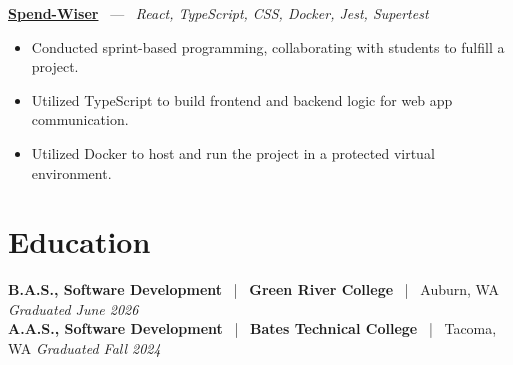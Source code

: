 \documentclass[10pt, letterpaper]{article}
\newcommand{\jobhead}[4]{%
  \vspace{5pt}%
  {\bfseries\color{dark}#1}%
  ~{\color{light}|}~%
  {\bfseries\color{navy}#2}%
  ~{\color{light}|}~%
  {\color{light}#3}%
  \hfill{\color{light}\small\textit{#4}}\\[-2pt]%
}
\newcommand{\projhead}[3]{%
  \vspace{5pt}%
  {\bfseries\color{dark}\href{#2}{#1}}%
  ~{\color{light}---}~%
  {\color{light}\small\textit{#3}}\\[-2pt]%
}
\begin{document}
\projhead{Spend-Wiser}{https://github.com/JesseChum/w26-sdev372-spendwiser-finance-tracker}{React, TypeScript, CSS, Docker, Jest, Supertest}
\begin{itemize}
  \item Conducted sprint-based programming, collaborating with students to fulfill a project.
  \item Utilized TypeScript to build frontend and backend logic for web app communication.
  \item Utilized Docker to host and run the project in a protected virtual environment.
\end{itemize}

\section{Education}

\jobhead{B.A.S., Software Development}{Green River College}{Auburn, WA}{Graduated June 2026}
\jobhead{A.A.S., Software Development}{Bates Technical College}{Tacoma, WA}{Graduated Fall 2024}
\end{document}
